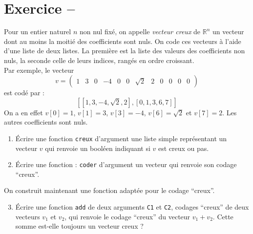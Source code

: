     







\section{Exercice -- }

Pour un entier naturel $n$ non nul fixé, on appelle \textit{vecteur creux} de $\mathbb{R}^n$ un vecteur dont au moins la moitié des coefficients sont nuls. On code ces vecteurs à l'aide d'une liste de deux listes. La première est la liste des valeurs des coefficients non nuls, la seconde celle de leurs indices, rangés en ordre croissant.\\
Par exemple, le vecteur
$$v=\left( \begin{array}{cccccccccccc}
1 & 3 & 0 & -4 & 0 & 0 & \sqrt{2} & 2 & 0 & 0 & 0 & 0
\end{array}\right)$$ est codé par : $$ [[1,3,-4,\sqrt{2},2],[0,1,3,6,7]]$$
On a en effet $v[0]=1$, $v[1]=3$, $v[3]=-4$, $v[6]=\sqrt{2}$ et $v[7]=2$. Les autres coefficients sont nuls.
\begin{enumerate}
\item \'Ecrire une fonction \texttt{creux} d'argument une liste simple représentant un vecteur $v$ qui renvoie un booléen indiquant si $v$ est creux ou pas.
\item \'Ecrire une fonction : \texttt{coder} d'argument un vecteur qui renvoie son codage ``creux''.%
\end{enumerate}
On construit maintenant une fonction adaptée pour le codage ``creux''.
\begin{enumerate}
\setcounter{enumi}{2}
\item \'Ecrire une fonction \texttt{add} de deux arguments \texttt{C1} et \texttt{C2}, codages ``creux'' de deux vecteurs $v_1$ et $v_2$, qui renvoie le codage ``creux'' du vecteur $v_1+v_2$. Cette somme est-elle toujours un vecteur creux ?
\end{enumerate}






